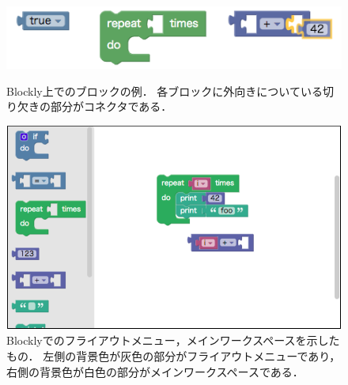 \begin{figure}[t]
 \centering
 \includegraphics[keepaspectratio, scale=0.5]{img/connector.png}
 \caption{Blockly上でのブロックの例．
各ブロックに外向きについている切り欠きの部分がコネクタである．\label{fig:connector}}
 \vspace{2zh}
 \includegraphics[keepaspectratio, scale=0.3]{img/blocklyWorkspace.png}
 \caption{Blocklyでのフライアウトメニュー，メインワークスペースを示したもの．
 左側の背景色が灰色の部分がフライアウトメニューであり，
 右側の背景色が白色の部分がメインワークスペースである．\label{fig:workspace}}
\end{figure}
